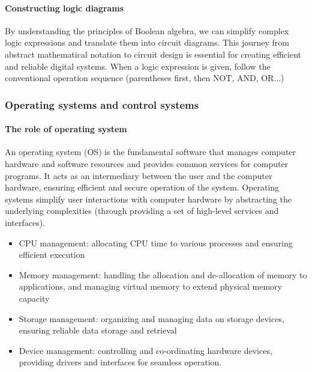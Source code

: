 \documentclass[a4paper,12pt]{article}
\begin{document}
\paragraph{Constructing logic diagrams}
By understanding the principles of Boolean algebra, we can simplify complex logic expressions and translate them into circuit diagrams. This journey from abstract mathematical notation 
to circuit design is essential for creating efficient and reliable digital systems. When a logic expression is given, follow the conventional operation sequence (parentheses first, then NOT, AND, OR...) 
\subsubsection{Operating systems and control systems}
\paragraph{The role of operating system}
An operating system (OS) is the fundamental software that manages computer hardware 
and software resources and provides common services for computer programs. It acts as an intermediary between the user and the computer hardware, ensuring efficient and secure operation of the system. Operating systems simplify user interactions with computer hardware by abstracting the underlying complexities (through providing a set of high-level services and interfaces).
\begin{itemize}
    \item CPU management: allocating CPU time to various processes and ensuring 
efficient execution 
	\item Memory management: handling the allocation and de-allocation of memory to 
applications, and managing virtual memory to extend physical memory capacity 
\item Storage management: organizing and managing data on storage devices, ensuring reliable data storage and retrieval 
\item Device management: controlling and co-ordinating hardware devices, providing drivers and interfaces for seamless operation. 
\end{itemize}
\end{document}
